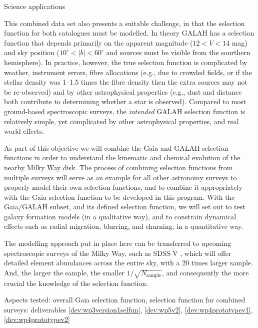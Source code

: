 \begin{workpackage}{Science applications}
\begin{wpobjectives}
\begin{description}
{        This combined data set also presents a suitable challenge, in that the selection function for both catalogues must be modelled. In theory GALAH has a selection function that depends primarily on the apparent magnitude ($12 < V <14$ mag) and sky position ($10^\circ < |b| < 60^\circ$ and sources must be visible from the sourthern hemisphere). In practice, however, the true selection function is complicated by weather, instrument errors, fibre allocations (e.g., due to crowded fields, or if the stellar density was 1--1.5 times the fibre density then the extra sources may not be re-observed) and by other astrophysical properties (e.g., dust and distance both contribute to determining whether a star is observed). Compared to most ground-based spectroscopic surveys, the \emph{intended} GALAH selection function is relatively simple, yet complicated by other astrophysical properties, and real world effects.
      
        As part of this objective we will combine the Gaia and GALAH selection functions in order to understand the kinematic and chemical evolution of the nearby Milky Way disk. The process of combining selection functions from multiple surveys will serve as an example for all other astronomy surveys to properly model their own selection functions, and to combine it appropriately with the Gaia selection function to be developed in this program. With the Gaia/GALAH subset, and its defined selection function, we will set out to test galaxy formation models (in a qualitative way), and to constrain dynamical effects such as radial migration, blurring, and churning, in a quantitative way. 
        
        The modelling approach put in place here can be transferred to upcoming spectroscopic surveys of the Milky Way, such as SDSS-V \citep{SDSS-V}, which will offer detailed element abundances across the entire sky, with a 20 times larger sample. And, the larger the sample, the smaller $1/\sqrt{N_\mathrm{sample}}$, and consequently the more crucial the knowledge of the selection function. 
        
        \textsf{Aspects tested: overall Gaia selection function, selection function for combined surveys: deliverables \ref{dev:wp3version1selfun}, \ref{dev:wp5v2}, \ref{dev:wp4prototypev1}, \ref{dev:wp4prototypev2}}
     }
     
    \end{description}
  \end{wpobjectives}


\end{workpackage}
